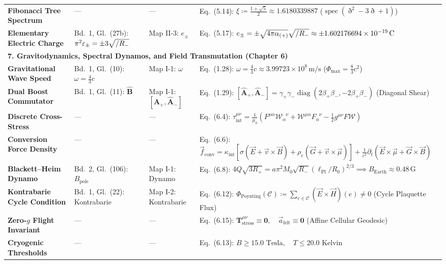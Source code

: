\documentclass[
    12pt,
    a4paper,
    headings=normal,
    twoside=false,
    open=any,
    parskip=half
]{scrbook}
\let\hbar\relax
\DeclareMathOperator{\spec}{spec}
\newcommand{\ethop}{\eth}
\begin{document}
\begin{longtable}{p{3.4cm}p{3.2cm}p{3.2cm}p{5.4cm}}
\textbf{Fibonacci Tree Spectrum} & — & — & Eq.~(5.14): $\xi \coloneqq \frac{1+\sqrt{5}}{2} \approx 1.6180339887$ ($\spec(\ethop^2 - 3\ethop + 1)$) \\
\textbf{Elementary Electric Charge} & Bd.~1, Gl.~(27b): $\pi^2\varepsilon_\pm = \pm 3\sqrt{\hbar/R_-}$ & Map II-3: $e_\pm$ & Eq.~(5.17): $e_\pm = \pm\sqrt{4\pi\alpha_{(+)}}\sqrt{\hbar/R_-} \approx \pm 1.602176694 \times 10^{-19}\,\text{C}$ \\\midrule
\multicolumn{4}{l}{\textsf{\textbf{\color{maincolor!90!black}7. Gravitodynamics, Spectral Dynamos, and Field Transmutation (Chapter 6)}}} \\\midrule
\textbf{Gravitational Wave Speed} & Bd.~1, Gl.~(10): $\omega = \frac{4}{3}c$ & Map I-1: $\omega$ & Eq.~(1.28): $\omega = \frac{4}{3}c \approx 3.99723 \times 10^8\,\text{m/s}$ ($\Phi_{\max} = \frac{8}{3}c^2$) \\
\textbf{Dual Boost Commutator} & Bd.~1, Gl.~(11): $\hat{\mathbf{B}}$ & Map I-1: $[\hat{\mathbf{A}}_+, \hat{\mathbf{A}}_-]$ & Eq.~(1.29): $[\hat{\mathbf{A}}_+, \hat{\mathbf{A}}_-] = \gamma_+\gamma_- \operatorname{diag}(2\beta_+\beta_-, -2\beta_+\beta_-)$ (Diagonal Shear) \\
\textbf{Discrete Cross-Stress} & — & — & Eq.~(6.4): $\tau_{\text{int}}^{\mu\nu} = \frac{1}{\mu_0}(F^{\mu\alpha}\mathcal{W}_\alpha^{\phantom{\alpha}\nu} + \mathcal{W}^{\mu\alpha}F_\alpha^{\phantom{\alpha}\nu} - \frac{1}{2}g^{\mu\nu}F\mathcal{W})$ \\
\textbf{Conversion Force Density} & — & — & Eq.~(6.6): $\vec{f}_{\text{conv}} = \kappa_{\text{int}}[\sigma(\vec{E}+\vec{v}\times\vec{B}) + \rho_e(\vec{G}+\vec{v}\times\vec{\mu})] + \frac{1}{c^2}\partial_t(\vec{E}\times\vec{\mu}+\vec{G}\times\vec{B})$ \\
\textbf{Blackett--Heim Dynamo} & Bd.~2, Gl.~(106): $B_{\text{pole}}$ & Map I-1: Dynamo & Eq.~(6.8): $4Q\sqrt{3R_+} = a\pi^2 M_0\sqrt{R_-}(\ell_{\text{Pl}}/R_0)^{2/3} \implies B_{\text{Earth}} \approx 0.48\,\text{G}$ \\
\textbf{Kontrabarie Cycle Condition} & Bd.~1, Gl.~(22): Kontrabarie & Map I-2: Kontrabarie & Eq.~(6.12): $\Phi_{\text{Poynting}}(\mathcal{C}) \coloneqq \sum_{e\in\mathcal{C}} (\vec{E}\times\vec{H})(e) \ne 0$ (Cycle Plaquette Flux) \\
\textbf{Zero-$g$ Flight Invariant} & — & — & Eq.~(6.15): $\mathbf{T}_{\text{stress}}^{\mu\nu} \equiv \mathbf{0}, \quad \vec{a}_{\text{felt}} \equiv \mathbf{0}$ (Affine Cellular Geodesic) \\
\textbf{Cryogenic Thresholds} & — & — & Eq.~(6.13): $B \ge 15.0\text{ Tesla}, \quad T \le 20.0\text{ Kelvin}$ \\\midrule

\end{longtable}
\end{document}
